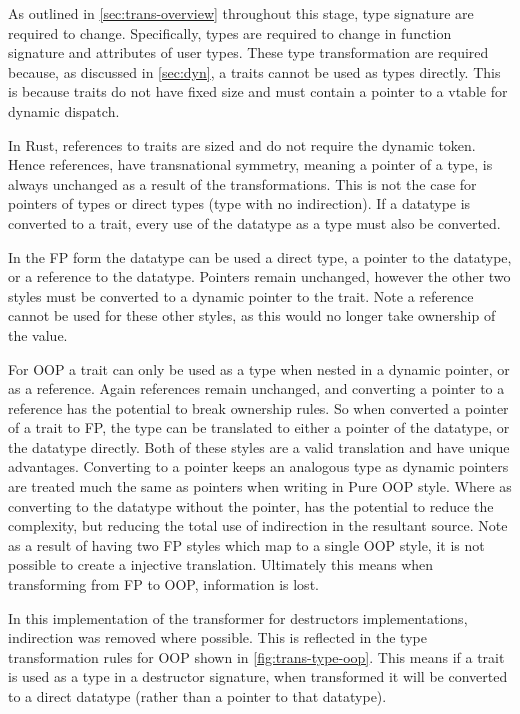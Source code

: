 \documentclass[ oneside,%
                    author={James Elgar},
                    degree={MEng},
                     title={Bidirectional transformer between functional and \\ object-oriented programming in Rust},
                  subtitle={}]{dissertation}
\begin{document}
As outlined in \autoref{sec:trans-overview} throughout this stage, type signature are required to change. Specifically, types are required to change in function signature and attributes of user types. 
These type transformation are required because, as discussed in \autoref{sec:dyn}, a traits cannot be used as types directly.  This is because traits do not have fixed size and must contain a pointer to a vtable for dynamic dispatch.

In Rust, references to traits are sized and do not require the dynamic token. Hence references, have transnational symmetry, meaning a pointer of a type, is always unchanged as a result of the transformations. This is not the case for pointers of types or direct types (type with no indirection). If a datatype is converted to a trait, every use of the datatype as a type must also be converted. 

In the FP form the datatype can be used a direct type, a pointer to the datatype, or a reference to the datatype. Pointers remain unchanged, however the other two styles must be converted to a dynamic pointer to the trait. Note a reference cannot be used for these other styles, as this would no longer take ownership of the value.

For OOP a trait can only be used as a type when nested in a dynamic pointer, or as a reference. Again references remain unchanged, and converting a pointer to a reference has the potential to break ownership rules. So when converted a pointer of a trait to FP, the type can be translated to either a pointer of the datatype, or the datatype directly. Both of these styles are a valid translation and have unique advantages. Converting to a pointer keeps an analogous type as dynamic pointers are treated much the same as pointers when writing in Pure OOP style. Where as converting to the datatype without the pointer, has the potential to reduce the complexity, but reducing the total use of indirection in the resultant source.
Note as a result of having two FP styles which map to a single OOP style, it is not possible to create a injective translation. Ultimately this means when transforming from FP to OOP, information is lost.

In this implementation of the transformer for destructors implementations, indirection was removed where possible. This is reflected in the type transformation rules for OOP shown in \autoref{fig:trans-type-oop}. This means if a trait is used as a type in a destructor signature, when transformed it will be converted to a direct datatype (rather than a pointer to that datatype).
\end{document}
